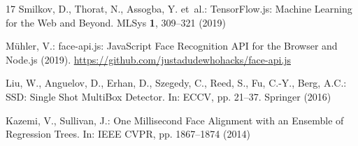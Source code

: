 \documentclass[runningheads]{llncs}
\begin{document}
\begin{thebibliography}{17}
Smilkov, D., Thorat, N., Assogba, Y. et~al.: {TensorFlow.js}: Machine Learning for the Web and Beyond. MLSys \textbf{1}, 309--321 (2019)

M\"{u}hler, V.: face-api.js: {JavaScript} Face Recognition {API} for the Browser and {Node.js} (2019). \url{https://github.com/justadudewhohacks/face-api.js}

Liu, W., Anguelov, D., Erhan, D., Szegedy, C., Reed, S., Fu, C.-Y., Berg, A.C.: {SSD}: Single Shot {MultiBox} Detector. In: ECCV, pp. 21--37. Springer (2016)

Kazemi, V., Sullivan, J.: One Millisecond Face Alignment with an Ensemble of Regression Trees. In: IEEE CVPR, pp. 1867--1874 (2014)

\end{thebibliography}
\end{document}
